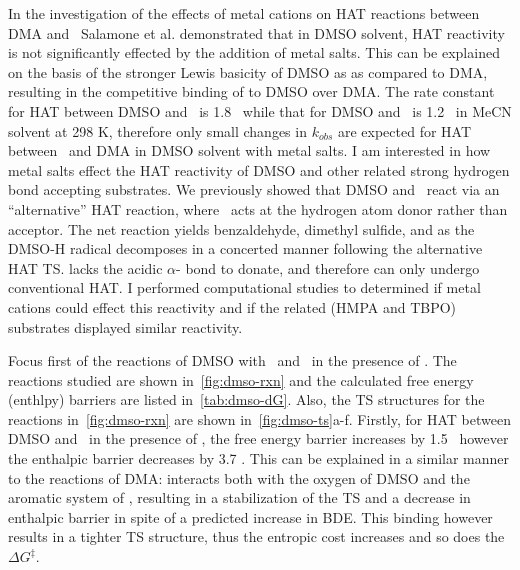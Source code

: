 In the investigation of the effects of metal cations on HAT reactions between DMA and \cumo\ Salamone et al. demonstrated that in DMSO solvent, HAT reactivity is not significantly effected by the addition of metal salts.\cite{Salamone2015metals} This can be explained on the basis of the stronger Lewis basicity of DMSO as as compared to DMA, resulting in the competitive binding of  to DMSO over DMA. The rate constant for HAT between DMSO and \cumo\ is 1.8  \Ms\ while that for DMSO and \cumo\ is 1.2  \Ms\ in MeCN solvent at 298 K, therefore only small changes in $k_{obs}$ are expected for HAT between \cumo\ and DMA in DMSO solvent with metal salts. I am interested in how metal salts effect the HAT reactivity of DMSO and other related strong hydrogen bond accepting substrates. We previously showed that DMSO and \bno\ react via an ``alternative'' HAT reaction, where \bno\ acts at the hydrogen atom donor rather than acceptor. The net reaction yields benzaldehyde, dimethyl sulfide, and  as the DMSO-H radical decomposes in a concerted manner following the alternative HAT TS. \cumo lacks the acidic $\alpha$- bond to donate, and therefore can only undergo conventional HAT. I performed computational studies to determined if metal cations could effect this reactivity and if the related (HMPA and TBPO) substrates displayed similar reactivity.

Focus first of the reactions of DMSO with \cumo\ and \bno\ in the presence of . The reactions studied are shown in~\ref{fig:dmso-rxn} and the calculated free energy (enthlpy) barriers are listed in~\ref{tab:dmso-dG}. Also, the TS structures for the reactions in~\ref{fig:dmso-rxn} are shown in~\ref{fig:dmso-ts}a-f. Firstly, for HAT between DMSO and \cumo\ in the presence of , the free energy barrier increases by 1.5 \kcalmol\, however the enthalpic barrier decreases by 3.7 \kcalmol. This can be explained in a similar manner to the reactions of DMA:  interacts both with the oxygen of DMSO and the aromatic system of \cumo, resulting in a stabilization of the TS and a decrease in enthalpic barrier in spite of a predicted increase in  BDE. This binding however results in a tighter TS structure, thus the entropic cost increases and so does the $\Delta G^\ddagger$.

